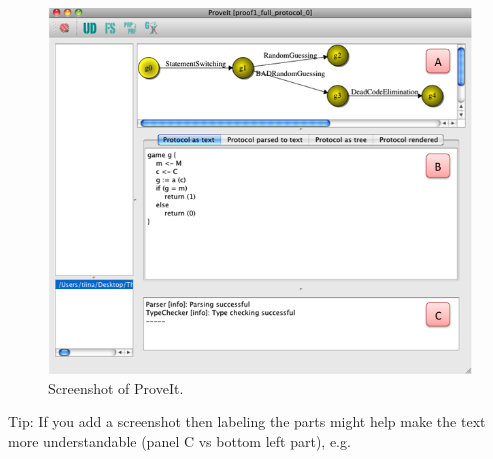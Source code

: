 \documentclass[12pt]{article}
\newcommand{\proveit}{ProveIt\xspace}
\begin{document}
\begin{figure} [p]
\begin{center}
\includegraphics[width=\textwidth]{proveit_screenshot}
\caption{Screenshot of \proveit.}
\label{fig:proveit_screenshot}
\end{center}
\end{figure}

Tip: If you add a screenshot then labeling the parts might help make the text more understandable (panel C vs bottom left part), e.g.
\end{document}
